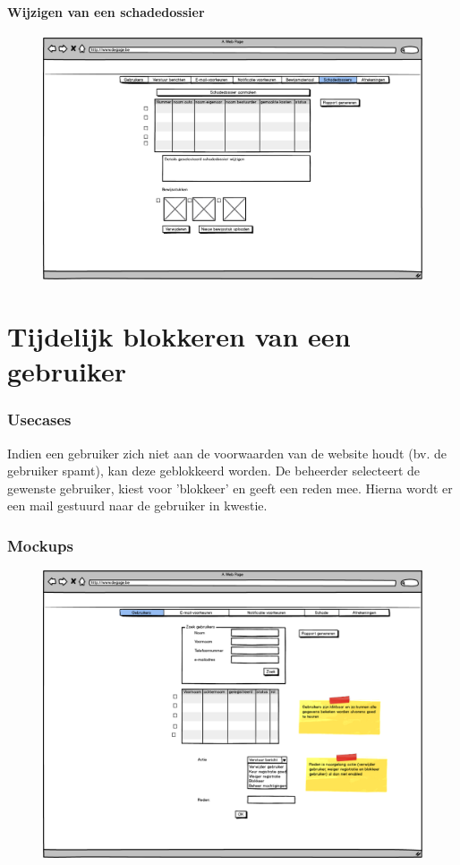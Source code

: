 \documentclass[11pt,a4paper,oneside]{article}
\begin{document}
\subsection{Wijzigen van een schadedossier}
\begin{figure}[H]\includegraphics[width=\textwidth]{../../mockups/admin_schadedossiers.png}\end{figure}

\setcounter{section}{0}
\setcounter{subsection}{0}
\part{Tijdelijk blokkeren van een gebruiker}
\section{Usecases}
Indien een gebruiker zich niet aan de voorwaarden van de website houdt (bv. de gebruiker spamt), kan deze geblokkeerd worden. 
De beheerder selecteert de gewenste gebruiker, kiest voor 'blokkeer' en geeft een reden mee. Hierna wordt er een mail gestuurd naar de gebruiker in kwestie.

\section{Mockups}
\begin{figure}[H]\includegraphics[width=\textwidth]{../../mockups/admin_dashboard_gebruikers.png}\end{figure}
\end{document}
